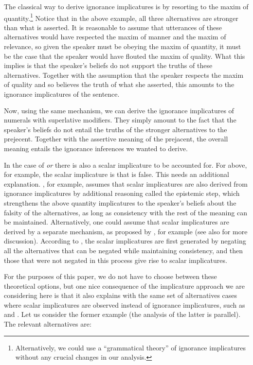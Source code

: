 \documentclass[output=paper]{langscibook}
\begin{document}
The classical way to derive ignorance implicatures is by resorting to the maxim of quantity.\footnote{Alternatively, we could use a ``grammatical theory'' of ignorance implicatures \citep{meyer, buccolahaida} without any crucial changes in our analysis.} Notice that in the above example, all three alternatives are stronger than what is asserted. It is reasonable to assume that utterances of these alternatives would have respected the maxim of manner and the maxim of relevance, so given the speaker must be obeying the maxim of quantity, it must be the case that the speaker would have flouted the maxim of quality. What this implies is that the speaker's beliefs do not support the truths of these alternatives.  Together with the assumption that the speaker respects the maxim of quality and so believes the truth of what she asserted, this amounts to the ignorance implicatures of the sentence.

Now, using the same mechanism, we can derive the ignorance implicatures of numerals with superlative modifiers. They simply amount to the fact that the speaker's beliefs do not entail the truths of the stronger alternatives to the prejecent. Together with the assertive meaning of the prejacent, the overall meaning entails the ignorance inferences we wanted to derive.

In the case of \textit{or} there is also a scalar implicature to be accounted for. For  above, for example, the scalar implicature is that  is false. This needs an additional explanation.  \citet{sauerland}, for example, assumes that scalar implicatures are also derived from ignorance implicatures by additional reasoning called the epistemic step, which strengthens the above quantity implicatures to the speaker's beliefs about the falsity of the alternatives, as long as consistency with the rest of the meaning can be maintained. Alternatively, one could assume that scalar implicatures are derived by a separate mechanism, as proposed by \citet{fox}, for example (see also \citet{buccolahaida} for more discussion). According to \citet{fox}, the scalar implicatures are first generated by negating all the alternatives that can be negated while maintaining consistency, and then those that were not negated in this process give rise to scalar implicatures.

For the purposes of this paper, we do not have to choose between these theoretical options, but one nice consequence of the implicature approach we are considering here is that it also explains with the same set of alternatives cases where scalar implicatures are observed instead of ignorance implicatures, such as  and . Let us consider the former example (the analysis of the latter is parallel). The relevant alternatives are:
\end{document}
